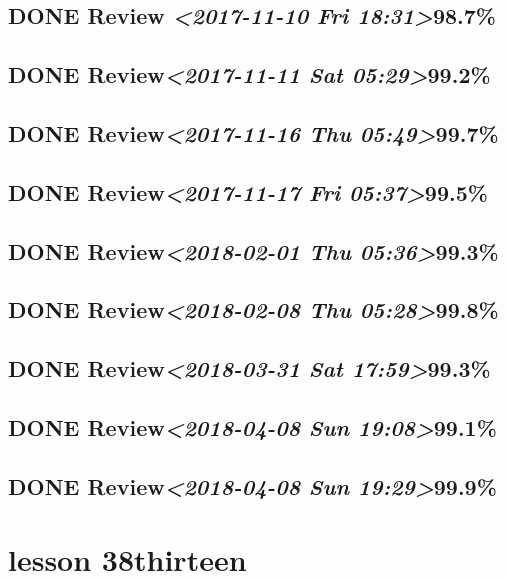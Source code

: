 \documentclass[11pt]{ctexart}
\begin{document}
\subsection{{\bfseries\sffamily DONE} Review \textit{<2017-11-10 Fri 18:31>}98.7\%}
\label{sec:orga3404ba}
\subsection{{\bfseries\sffamily DONE} Review\textit{<2017-11-11 Sat 05:29>}99.2\%}
\label{sec:org1fa55b3}
\subsection{{\bfseries\sffamily DONE} Review\textit{<2017-11-16 Thu 05:49>}99.7\%}
\label{sec:orga35f08a}

\subsection{{\bfseries\sffamily DONE} Review\textit{<2017-11-17 Fri 05:37>}99.5\%}
\label{sec:org850635b}
\subsection{{\bfseries\sffamily DONE} Review\textit{<2018-02-01 Thu 05:36>}99.3\%}
\label{sec:orgce32c2a}
\subsection{{\bfseries\sffamily DONE} Review\textit{<2018-02-08 Thu 05:28>}99.8\%}
\label{sec:org2729523}
\subsection{{\bfseries\sffamily DONE} Review\textit{<2018-03-31 Sat 17:59>}99.3\%}
\label{sec:org5ce5860}
\subsection{{\bfseries\sffamily DONE} Review\textit{<2018-04-08 Sun 19:08>}99.1\%}
\label{sec:orgd86bc3d}
\subsection{{\bfseries\sffamily DONE} Review\textit{<2018-04-08 Sun 19:29>}99.9\%}
\label{sec:org7f9f4c2}
\section{lesson 38thirteen}
\label{sec:orgd587785}
\end{document}
